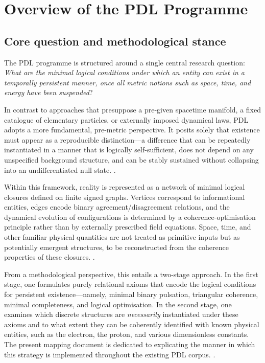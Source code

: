 \documentclass{article}
\begin{document}
\section{Overview of the PDL Programme}
\label{sec:overview}

\subsection{Core question and methodological stance}
\label{subsec:core_question}

The PDL programme is structured around a single central research question: \emph{What are the minimal logical conditions under which an entity can exist in a temporally persistent manner, once all metric notions such as space, time, and energy have been suspended}? \cite{PDL_Main_2026,PDL_intro}

In contrast to approaches that presuppose a pre-given spacetime manifold, a fixed catalogue of elementary particles, or externally imposed dynamical laws, PDL adopts a more fundamental, pre-metric perspective. It posits solely that existence must appear as a reproducible distinction—a difference that can be repeatedly instantiated in a manner that is logically self-sufficient, does not depend on any unspecified background structure, and can be stably sustained without collapsing into an undifferentiated null state.
\cite{PDL_Main_2026,PDL_position}.

Within this framework, reality is represented as a network of minimal logical closures defined on finite signed graphs. Vertices correspond to informational entities, edges encode binary agreement/disagreement relations, and the dynamical evolution of configurations is determined by a coherence-optimisation principle rather than by externally prescribed field equations. Space, time, and other familiar physical quantities are not treated as primitive inputs but as potentially emergent structures, to be reconstructed from the coherence properties of these closures.
\cite{PDL_Main_2026,PDL_intro}.

From a methodological perspective, this entails a two-stage approach. In the first stage, one formulates purely relational axioms that encode the logical conditions for persistent existence—namely, minimal binary pulsation, triangular coherence, minimal completeness, and logical optimisation. In the second stage, one examines which discrete structures are \emph{necessarily} instantiated under these axioms and to what extent they can be coherently identified with known physical entities, such as the electron, the proton, and various dimensionless constants. The present mapping document is dedicated to explicating the manner in which this strategy is implemented throughout the existing PDL corpus. 
\cite{PDL_position}.
\end{document}
